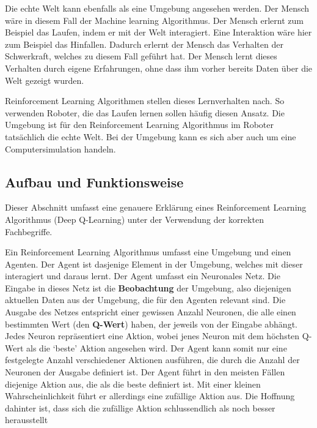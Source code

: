 Die echte Welt kann ebenfalls als eine Umgebung angesehen werden. Der Mensch
wäre in diesem Fall der Machine learning Algorithmus. Der Mensch erlernt zum
Beispiel das Laufen, indem er mit der Welt interagiert. Eine Interaktion wäre
hier zum Beispiel das Hinfallen. Dadurch erlernt der Mensch das Verhalten der
Schwerkraft, welches zu diesem Fall geführt hat. Der Mensch lernt dieses
Verhalten durch eigene Erfahrungen, ohne dass ihm vorher bereits Daten über die
Welt gezeigt wurden. 

Reinforcement Learning Algorithmen stellen dieses Lernverhalten nach. So
verwenden Roboter, die das Laufen lernen sollen häufig diesen Ansatz. Die
Umgebung ist für den Reinforcement Learning Algorithmus im Roboter tatsächlich
die echte Welt. Bei der Umgebung kann es sich aber auch um eine
Computersimulation handeln.

\subsection*{Aufbau und Funktionsweise}

Dieser Abschnitt umfasst eine genauere Erklärung eines Reinforcement Learning
Algorithmus (Deep Q-Learning) unter der Verwendung der korrekten Fachbegriffe.

Ein Reinforcement Learning Algorithmus umfasst eine Umgebung und einen Agenten.
Der Agent ist dasjenige Element in der Umgebung, welches mit dieser interagiert
und daraus lernt. Der Agent umfasst ein Neuronales Netz. Die Eingabe in dieses
Netz ist die \textbf{Beobachtung} der Umgebung, also diejenigen aktuellen Daten
aus der Umgebung, die für den Agenten relevant sind. Die Ausgabe des Netzes
entspricht einer gewissen Anzahl Neuronen, die alle einen bestimmten Wert (den
\textbf{Q-Wert}) haben, der jeweils von der Eingabe abhängt. Jedes Neuron
repräsentiert eine Aktion, wobei jenes Neuron mit dem höchsten Q-Wert als die
`beste' Aktion angesehen wird. Der Agent kann somit nur eine festgelegte Anzahl
verschiedener Aktionen ausführen, die durch die Anzahl der Neuronen der Ausgabe
definiert ist. Der Agent führt in den meisten Fällen diejenige Aktion aus, die
als die beste definiert ist. Mit einer kleinen Wahrscheinlichkeit führt er
allerdings eine zufällige Aktion aus. Die Hoffnung dahinter ist, dass sich die
zufällige Aktion schlussendlich als noch besser herausstellt 

